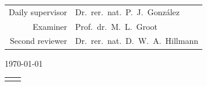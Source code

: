 \begin{titlepage}
\begin{center}
        \vfill

        \begin{tabular}{rl}
            Daily supervisor & Dr.\ rer.\ nat.\ P.\ J.\ González     \\
            Examiner         & Prof.\ dr.\ M.\ L.\ Groot             \\
            Second reviewer  & Dr.\ rer.\ nat.\ D.\ W.\ A.\ Hillmann
        \end{tabular}

        \vfill

        \today

        \vfill

        \begin{tabularx}{\textwidth}{vu}
             &
        \end{tabularx}

    \end{center}
\end{titlepage}